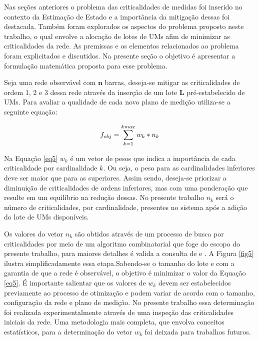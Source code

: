 \documentclass[12pt]{article}
\begin{document}
Nas seções anteriores o problema das criticalidades de medidas foi inserido no contexto da Estimação de Estado e a importância da mitigação dessas foi destacada. Também foram explorados os aspectos do problema proposto neste trabalho, o qual envolve a alocação de lotes de UMs afim de minimizar as criticalidades da rede. As premissas e os elementos relacionados ao problema foram explicitados e discutidos. Na presente seção o objetivo é apresentar a formulação matemática proposta para esse problema.

Seja uma rede observável com $\mathbf{n}$ barras, deseja-se mitigar as criticalidades de ordem 1, 2 e 3 dessa rede através da inserção de um lote $\mathbf{L}$ pré-estabelecido de UMs. Para avaliar a qualidade de cada novo plano de medição utiliza-se a seguinte equação:
	
	\begin{equation}
		f_{obj} =  \sum_{k=1}^{kmax}w_k*n_k	\\	
		\label{eq5}
	\end{equation}
	
Na Equação \ref{eq5}  $w_k$ é um vetor de pesos que indica a importância de cada criticalidade por cardinalidade $k$. Ou seja, o peso para as cardinalidades inferiores deve ser maior que para as superiores. Assim sendo, deseja-se priorizar a diminuição de criticalidades de ordens inferiores, mas com uma ponderação que resulte em um equilíbrio na redução dessas. No presente trabalho $n_k$ será o número de criticalidades, por cardinalidade, presentes no sistema após a adição do lote de UMs disponíveis. 

Os valores do vetor $n_k$ são obtidos através de um processo de busca por criticalidades por meio de um algoritmo combinatorial que foge do escopo do presente trabalho, para maiores detalhes é valida a consulta de \cite{AbelTese16} e \cite{BB16}. A Figura \ref{fig5} ilustra simplificadamente essa etapa.Sabendo-se o tamanho do lote e com a garantia de que a rede é observável, o objetivo é minimizar o valor da Equação \ref{eq5}. É importante salientar que os valores de $w_k$ devem ser estabelecidos previamente ao processo de otimização e podem variar de acordo com o tamanho, configuração da rede e plano de medição. No presente trabalho essa determinação foi realizada experimentalmente através de uma inspeção das criticalidades iniciais da rede. Uma metodologia mais completa, que envolva conceitos estatísticos, para a determinação do vetor $w_k$ foi deixada para trabalhos futuros.
\end{document}

